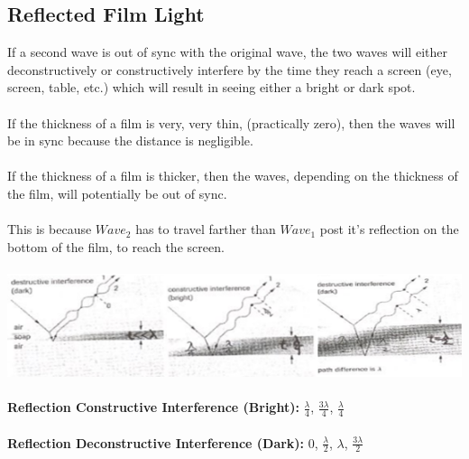 \documentclass{article}
\begin{document}
\subsection{Reflected Film Light}
If a second wave is out of sync with the original wave, the two waves will either deconstructively or constructively interfere by the time they reach a screen (eye, screen, table, etc.) which will result in seeing either a bright or dark spot.\\\\
If the thickness of a film is very, very thin, (practically zero), then the waves will be in sync because the distance is negligible. \\\\
If the thickness of a film is thicker, then the waves, depending on the thickness of the film, will potentially be out of sync. \\\\
This is because $Wave_2$ has to travel farther than $Wave_1$ post it's reflection on the bottom of the film, to reach the screen.\\\\
\includegraphics[scale=0.5]{images/reflected_films} \\\\
\noindent \textbf{Reflection Constructive Interference (Bright):} $\frac{\lambda}{4}$, $\frac{3\lambda}{4}$, $\frac{\lambda}{4}$ \\\\
\textbf{Reflection Deconstructive Interference (Dark):} $0$, $\frac{\lambda}{2}$, $\lambda$, $\frac{3\lambda}{2}$ \\\\
\end{document}
